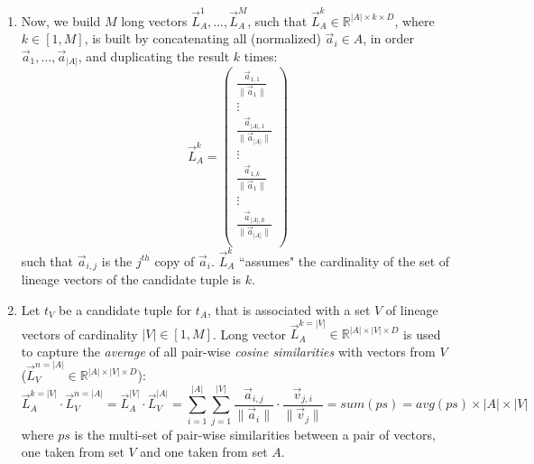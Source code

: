 \begin{enumerate}
    \item Now, we build $M$ long vectors $\vec{L}_{A}^1, ..., \vec{L}_{A}^M$, such that $\vec{L}_{A}^k \in \mathbb{R}^{|A| \times k \times D}$, where $k \in [1, M]$, is built by concatenating all (normalized) $\vec{a}_i \in A$, in order $\vec{a}_1, ..., \vec{a}_{|A|}$, and duplicating the result $k$ times: \\
        \begin{equation*}
            \vec{L}_{A}^k = \begin{pmatrix}
                    \frac{\vec{a}_{1, 1}}{\lVert \vec{a}_1 \rVert}\\ 
                    \vdots\\ 
                    \frac{\vec{a}_{|A|, 1}}{\lVert \vec{a}_{|A|} \rVert}\\ 
                   \vdots\\ 
                   \frac{\vec{a}_{1, k}}{\lVert \vec{a}_{1} \rVert}\\ 
                   \vdots\\ 
                   \frac{\vec{a}_{|A|, k}}{\lVert \vec{a}_{|A|} \rVert}\\
                   \end{pmatrix}
       \end{equation*}
       such that $\vec{a}_{i, j}$ is the $j^{th}$ copy of $\vec{a}_i$.
       $\vec{L}_{A}^k$ ``assumes" the cardinality of the set of lineage vectors of the candidate tuple is $k$.
    \item Let $t_V$ be a candidate tuple for $t_A$, that is associated with a set $V$ of lineage vectors of cardinality $|V| \in [1, M]$.
   Long vector $\vec{L}_{A}^{k=|V|} \in \mathbb{R}^{|A| \times |V| \times D}$ is used to capture the \textit{average} of all pair-wise \textit{cosine similarities} with vectors from $V$ ($\vec{L}_V^{n=|A|} \in \mathbb{R}^{|A| \times |V| \times D}$):\\
    \begin{equation*}
        \vec{L}_{A}^{k=|V|} \cdot \vec{L}_V^{n=|A|} =
        \vec{L}_{A}^{|V|} \cdot \vec{L}_V^{|A|} = \sum_{i = 1}^{|A|}{\sum_{j = 1}^{|V|} \frac{\vec{a}_{i, j}}{\lVert \vec{a}_i \rVert} \cdot \frac{\vec{v}_{j, i}}{\lVert \vec{v}_j \rVert}} = sum(ps) = avg(ps) \times |A| \times |V|
    \end{equation*}
    where $ps$ is the multi-set of pair-wise similarities between a pair of vectors, one taken from set $V$ and one taken from set $A$.
    

\end{enumerate}
